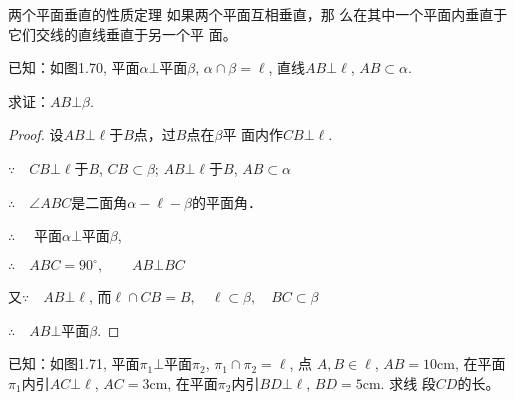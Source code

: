 \begin{blk}
  {两个平面垂直的性质定理} 如果两个平面互相垂直，那
么在其中一个平面内垂直于它们交线的直线垂直于另一个平
面。
\end{blk}

已知：如图1.70, 平面$\alpha\bot $平面$\beta$, 
$\alpha\cap\beta =\ell$, 直线$AB\bot\ell$, $AB\subset\alpha$. 

求证：$AB\bot\beta$.

\begin{proof}
设$AB\bot\ell$于$B$点，过$B$点在$\beta$平
面内作$CB\bot\ell$.

$\because\quad CB\bot\ell$于$B$, $CB\subset \beta$; 
$AB\bot\ell$于$B$, $AB\subset\alpha$

$\therefore\quad \angle ABC$是二面角$\alpha-\ell-\beta$的平面角．

$\therefore\quad$ 平面$\alpha\bot$平面$\beta$,

$\therefore\quad ABC=90^{\circ},\qquad AB\bot BC$

又$\because\quad AB\bot \ell$, 而$\ell\cap CB=B,\quad \ell\subset \beta,\quad BC\subset \beta$

$\therefore\quad AB\bot$平面$\beta$.
\end{proof}

\begin{example}
  已知：如图1.71, 平面$\pi_1\bot $平面$\pi_2$, $\pi_1\cap \pi_2=\ell$, 点
$A,B\in \ell$, $AB=10$cm, 在平面$\pi_1$内引$AC\bot\ell$, 
$AC=3$cm, 在平面$\pi_2$内引$BD\bot\ell$, $BD=5$cm. 求线
段$CD$的长。
\end{example}

\begin{figure}[htp]
  \centering
{}
  \caption{}
\end{figure}

